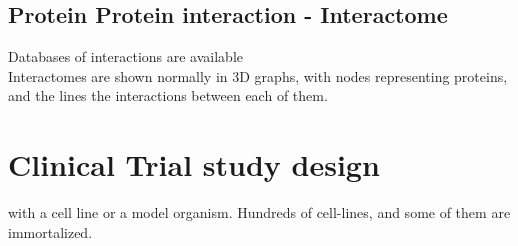 \subsection{Protein Protein interaction - Interactome}
Databases of interactions are available\\

Interactomes are shown normally in 3D graphs, with nodes representing proteins, and the lines the interactions between each of them.	


\section{Clinical Trial study design}
with a cell line or a model organism. Hundreds of cell-lines, and some of them  are immortalized.


